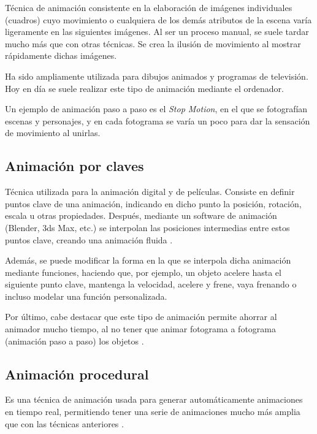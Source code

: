 \documentclass{article}
\begin{document}
Técnica de animación consistente en la elaboración de imágenes individuales (cuadros) cuyo movimiento o cualquiera de los demás atributos de la escena varía ligeramente en las siguientes imágenes. Al ser un proceso manual, se suele tardar mucho más que con otras técnicas. Se crea la ilusión de movimiento al mostrar rápidamente dichas imágenes. 

\bigskip

Ha sido ampliamente utilizada para dibujos animados y programas de televisión. Hoy en día se suele realizar este tipo de animación mediante el ordenador. 

\bigskip

Un ejemplo de animación paso a paso es el \textit{Stop Motion}, en el que se fotografían escenas y personajes, y en cada fotograma se varía un poco para dar la sensación de movimiento al unirlas.


\subsection{Animación por claves}

Técnica utilizada para la animación digital y de películas. Consiste en definir puntos clave de una animación, indicando en dicho punto la posición, rotación, escala u otras propiedades. Después, mediante un software de animación (Blender, 3ds Max, etc.) se interpolan las posiciones intermedias entre estos puntos clave, creando una animación fluida \cite{keyframe}.

\bigskip

Además, se puede modificar la forma en la que se interpola dicha animación mediante funciones, haciendo que, por ejemplo, un objeto acelere hasta el siguiente punto clave, mantenga la velocidad, acelere y frene, vaya frenando o incluso modelar una función personalizada.

\bigskip

Por último, cabe destacar que este tipo de animación permite ahorrar al animador mucho tiempo, al no tener que animar fotograma a fotograma (animación paso a paso) los objetos \cite{keyframe}.


\subsection{Animación procedural}

Es una técnica de animación usada para generar automáticamente animaciones en tiempo real, permitiendo tener una serie de animaciones mucho más amplia que con las técnicas anteriores \cite{proc}.
\end{document}
